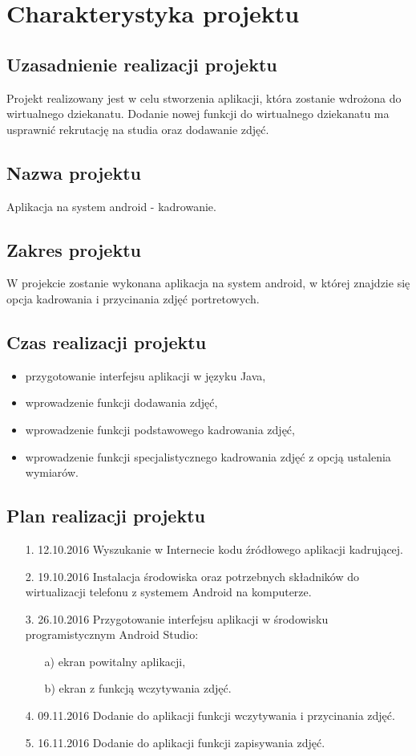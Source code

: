 \chapter {Charakterystyka projektu}
\section {Uzasadnienie realizacji projektu}
Projekt realizowany jest w celu stworzenia aplikacji, która zostanie wdrożona do wirtualnego dziekanatu.
Dodanie nowej funkcji do wirtualnego dziekanatu ma usprawnić rekrutację na studia oraz dodawanie zdjęć.
\section {Nazwa projektu}
Aplikacja na system android - kadrowanie.
\section {Zakres projektu}
W projekcie zostanie wykonana aplikacja na system android, w której znajdzie się opcja kadrowania i przycinania zdjęć portretowych.
\section {Czas realizacji projektu}
\begin{itemize}
\item przygotowanie interfejsu aplikacji w języku Java,
\item wprowadzenie funkcji dodawania zdjęć, 
\item wprowadzenie funkcji podstawowego kadrowania zdjęć, 
\item wprowadzenie funkcji specjalistycznego kadrowania zdjęć z opcją ustalenia wymiarów.
\end{itemize}

\section{Plan realizacji projektu}
\begin{itemize}
\item [1.] 12.10.2016 Wyszukanie w Internecie kodu źródłowego aplikacji kadrującej.
\item [2.] 19.10.2016 Instalacja środowiska oraz potrzebnych składników do wirtualizacji telefonu z systemem Android na komputerze. 
\item [3.] 26.10.2016 Przygotowanie interfejsu aplikacji w środowisku programistycznym Android Studio:
\begin{itemize}
\item [a)] ekran powitalny aplikacji,
\item [b)] ekran z funkcją wczytywania zdjęć.
\end{itemize} 
\item [4.] 09.11.2016 Dodanie do aplikacji funkcji wczytywania i przycinania zdjęć.
\item [5.] 16.11.2016 Dodanie do aplikacji funkcji zapisywania zdjęć.

\end{itemize}

